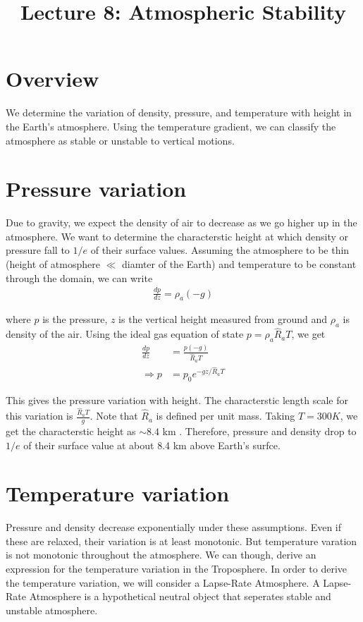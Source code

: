 \documentclass[11pt,a4paper]{article}
\title{Lecture 8: Atmospheric Stability}
\author{}
\begin{document}
\maketitle
\section*{Overview}

We determine the variation of density, pressure, and temperature with height in the Earth's atmosphere. Using the temperature gradient, we can classify the atmosphere as stable or unstable to vertical motions. 

\section{Pressure variation}
Due to gravity, we expect the density of air to decrease as we go higher up in the atmosphere. We want to determine the characterstic height at which density or pressure fall to $1/e$ of their surface values. Assuming the atmosphere to be thin (height of atmosphere $\ll$ diamter of the Earth) and temperature to be constant through the domain, we can write
\begin{align*}
\frac{dp}{dz} = \rho_a (-g)
\end{align*}

where $p$ is the pressure, $z$ is the vertical height measured from ground and $\rho_a$ is density of the air. Using the ideal gas equation of state $p=\rho_a \hat{R}_a T$, we get
\begin{align*}
\frac{dp}{dz} &= \frac{p(-g)}{\hat{R}_a T} \\
\Rightarrow p &= p_0 e^{-gz/\hat{R}_a T}
\end{align*}

This gives the pressure variation with height. The characterstic length scale for this variation is $\frac{\hat{R}_a T}{g}$. Note that $\hat{R}_a$ is defined per unit mass. Taking $T=300K$, we get the characterstic height as $\sim 8.4$ km . Therefore, pressure and density drop to $1/e$ of their surface value at about 8.4 km above Earth's surfce.

\section{Temperature variation}
Pressure and density decrease exponentially under these assumptions. Even if these are relaxed, their variation is at least monotonic. But temperature varation is not monotonic throughout the atmosphere. We can though, derive an expression for the temperature variation in the Troposphere. In order to derive the temperature variation, we will consider a Lapse-Rate Atmosphere. A Lapse-Rate Atmosphere is a hypothetical neutral object that seperates stable and unstable atmosphere. 
\end{document}
